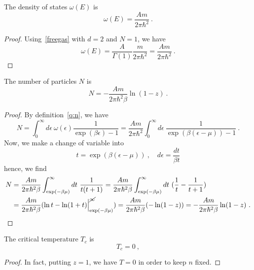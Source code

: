     The density of states $\omega(E)$ is 
    \begin{equation*}
        \omega(E) = \frac{A m}{2 \pi \hbar^2} ~.
    \end{equation*}
    \begin{proof}
        Using~\eqref{freegas} with $d = 2$ and $N=1$, we have
        \begin{equation*}
            \omega (E) = \frac{A}{\Gamma(1)} \frac{m}{2 \pi \hbar^2} = \frac{A m}{2 \pi \hbar^2} ~.
        \end{equation*}
    \end{proof}

    The number of particles $N$ is 
    \begin{equation*}
        N = -\frac{A m}{2 \pi \hbar^2 \beta} \ln (1-z) ~.
    \end{equation*}
    \begin{proof}
        By definition~\eqref{q:n}, we have 
        \begin{equation}
            N = \int_0^\infty d\epsilon ~ \omega(\epsilon) \frac{1}{\exp(\beta \epsilon) - 1} = \frac{A m}{2 \pi \hbar^2} \int_0^\infty d\epsilon ~ \frac{1}{\exp(\beta (\epsilon - \mu)) - 1} ~.
        \end{equation}
        Now, we make a change of variable into 
        \begin{equation}
            t = \exp(\beta (\epsilon - \mu)) ~, \quad d\epsilon = \frac{dt}{\beta t} 
        \end{equation}
        hence, we find 
        \begin{equation*}
        \begin{aligned}
            N & = \frac{A m}{2 \pi \hbar^2 \beta} \int_{\exp(-\beta \mu)}^\infty dt ~ \frac{1}{t (t+1)} = \frac{A m}{2 \pi \hbar^2 \beta} \int_{\exp(-\beta \mu)}^\infty dt ~ (\frac{1}{t} - \frac{1}{t+1} ) \\ & = \frac{A m}{2 \pi \hbar^2 \beta} (\ln t - \ln (1+t) \Big \vert_{\exp(-\beta \mu)}^{\cancel \infty} ) = \frac{A m}{2 \pi \hbar^2 \beta} (- \ln (1-z)) = -\frac{A m}{2 \pi \hbar^2 \beta} \ln (1-z) ~.
        \end{aligned}
    \end{equation*}
    \end{proof}

    The critical temperature $T_c$ is 
    \begin{equation*}
        T_c = 0 ~,
    \end{equation*}
    \begin{proof}
        In fact, putting $z = 1$, we have $T=0$ in order to keep $n$ fixed.
    \end{proof}

